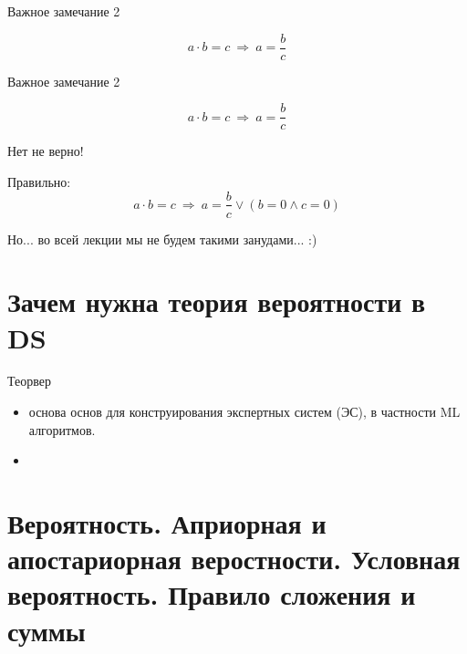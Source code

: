 \begin{frame}[fragile,t]{Важное замечание 2}
	
	\begin{equation*}
	a \cdot b = c ~\Longrightarrow~ a = \frac{b}{c}
	\end{equation*}
	
	
	
\end{frame}

\begin{frame}[fragile,t]{Важное замечание 2}
	
	\begin{equation*}
	a \cdot b = c ~\Longrightarrow~ a = \frac{b}{c}
	\end{equation*}
	
	Нет не верно!
	
	Правильно:
	\begin{equation*}
	a \cdot b = c ~\Longrightarrow~ a = \frac{b}{c} \vee (b=0 \wedge c =0)
	\end{equation*}
	
	Но... во всей лекции мы не будем такими занудами... :)
	
	
\end{frame}


    
  
\section{Зачем нужна теория вероятности в DS}\label{section:why_probability}
\begin{frame}
Теорвер

\begin{itemize}
\item основа основ для конструирования экспертных систем (ЭС), 
в частности ML алгоритмов.
\item 
\end{itemize}
\end{frame}

\section{Вероятность. Априорная и апостариорная веростности. Условная вероятность. Правило сложения и суммы}\label{section:probability}

